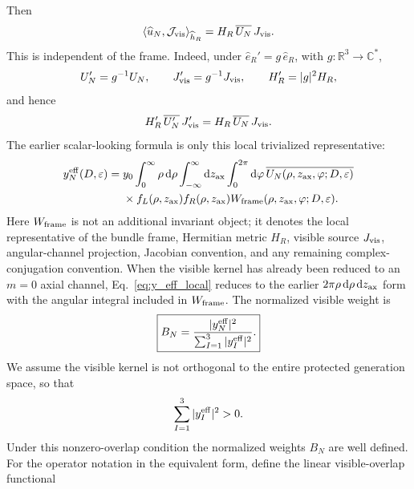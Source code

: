 \documentclass[aps,prd,preprint,notitlepage,nofootinbib,superscriptaddress,floatfix]{revtex4-2}
\newcommand{\dd}{\mathrm{d}}
\theoremstyle{remark}
\begin{document}
Then
\begin{equation}
\left\langle
\widehat u_N,
\mathcal J_{\rm vis}
\right\rangle_{\widehat h_R}
=
H_R\,\overline{U_N}\,J_{\rm vis}.
\label{eq:local_visibility_pairing}
\end{equation}
This is independent of the frame.
Indeed, under \(\widehat e_R'=g\,\widehat e_R\), with \(g:\mathbb R^3\to\mathbb C^*\),
\begin{equation}
U_N'=g^{-1}U_N,
\qquad
J_{\rm vis}'=g^{-1}J_{\rm vis},
\qquad
H_R'=|g|^2H_R,
\end{equation}
and hence
\begin{equation}
H_R'\,\overline{U_N'}\,J_{\rm vis}'
=
H_R\,\overline{U_N}\,J_{\rm vis}.
\label{eq:frame_invariance}
\end{equation}
The earlier scalar-looking formula is only this local trivialized representative:
\begin{equation}
\begin{aligned}
y_N^{\rm eff}(D,\varepsilon)
=\;&
y_0
\int_0^\infty \rho\,\dd\rho
\int_{-\infty}^{\infty}\dd z_{\rm ax}
\int_0^{2\pi}\dd\varphi\,
\overline{U_N(\rho,z_{\rm ax},\varphi;D,\varepsilon)}
\\
&\times
f_L(\rho,z_{\rm ax})
f_R(\rho,z_{\rm ax})
W_{\rm frame}(\rho,z_{\rm ax},\varphi;D,\varepsilon).
\end{aligned}
\label{eq:y_eff_local}
\end{equation}
Here \(W_{\rm frame}\) is not an additional invariant object; it denotes the local representative of the bundle frame, Hermitian metric \(H_R\), visible source \(J_{\rm vis}\), angular-channel projection, Jacobian convention, and any remaining complex-conjugation convention.
When the visible kernel has already been reduced to an \(m=0\) axial channel, Eq.~\eqref{eq:y_eff_local} reduces to the earlier \(2\pi\rho\,\dd\rho\,\dd z_{\rm ax}\) form with the angular integral included in \(W_{\rm frame}\).
The normalized visible weight is
\begin{equation}
\boxed{
B_N
=
\frac{|y_N^{\rm eff}|^2}
{\sum_{I=1}^{3}|y_I^{\rm eff}|^2}.
}
\label{eq:BN}
\end{equation}
We assume the visible kernel is not orthogonal to the entire protected generation space, so that
\begin{equation}
\sum_{I=1}^{3}|y_I^{\rm eff}|^2>0.
\label{eq:BN_denominator_nonzero}
\end{equation}
Under this nonzero-overlap condition the normalized weights \(B_N\) are well defined.
For the operator notation in the equivalent form, define the linear visible-overlap functional
\end{document}
